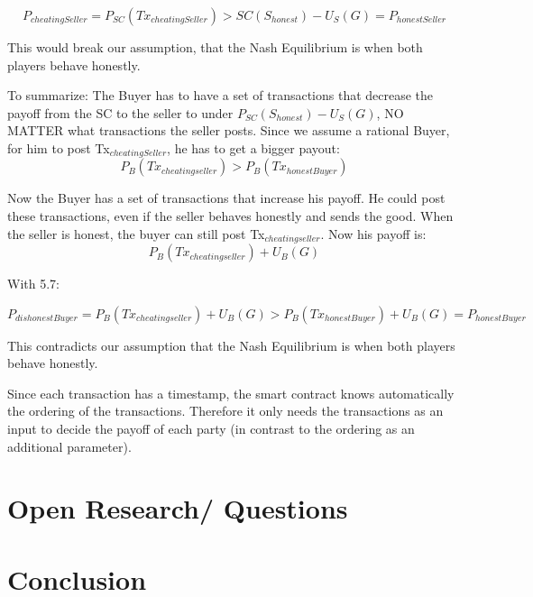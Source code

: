 \documentclass{cacthesis}
\begin{document}
\[P_{cheatingSeller} = P_{SC}(Tx_{cheatingSeller}) > {SC}(S_{honest})- U_S(G) =  P_{honestSeller}\]

This would break our assumption, that the Nash Equilibrium is when both players behave honestly.\newline

To summarize: The Buyer has to have a set of transactions that decrease the payoff from the SC to the seller to under $P_{SC}(S_{honest})- U_S(G)$, NO MATTER what transactions the seller posts.\newline
Since we assume a rational Buyer, for him to post Tx$_{cheatingSeller}$, he has to get a bigger payout:
\begin{equation}
    P_{B}(Tx_{cheatingseller}) > P_{B}(Tx_{honestBuyer})
\end{equation}

Now the Buyer has a set of transactions that increase his payoff.  He could post these transactions, even if the seller behaves honestly and sends the good.\newline
{}
When the seller is honest, the buyer can still post Tx$_{cheatingseller}$. Now his payoff is:
\[P_{B}(Tx_{cheatingseller}) + U_B(G)\]

With 5.7:

\begin{equation}
    P_{dishonestBuyer} = P_{B}(Tx_{cheatingseller}) + U_B(G) > P_{B}(Tx_{honestBuyer}) + U_B(G) = P_{honestBuyer}
\end{equation}

This contradicts our assumption that the Nash Equilibrium is when both players behave honestly.

Since each transaction has a timestamp, the smart contract knows automatically the ordering of the transactions. Therefore it only needs the transactions as an input to decide the payoff of each party (in contrast to the ordering as an additional parameter).

\chapter{Open Research/ Questions}

\chapter{Conclusion}
	
	
	
	\appendix
\end{document}
